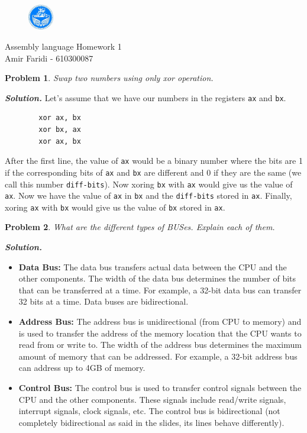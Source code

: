 \documentclass[12pt]{article}
\newtheorem{problem}{Problem}
\newenvironment{solution}[1][\it{Solution}]{\textbf{#1. } }{}
\begin{document}
\begin{figure}
    \centering
    \includegraphics[width=0.1\textwidth]{logo.png}
\end{figure}

\noindent  Assembly language \hfill Homework 1\\
Amir Faridi - 610300087

\hrulefill


\begin{problem}
Swap two numbers using only xor operation.
\end{problem}
\begin{solution}
    Let's assume that we have our numbers in the registers \texttt{ax} and \texttt{bx}.
    \begin{verbatim}
        xor ax, bx
        xor bx, ax
        xor ax, bx
    \end{verbatim}

    After the first line, the value of \texttt{ax} would be a binary number where the bits are 1 if the corresponding bits of \texttt{ax} and \texttt{bx} are different and 0 if they are the same (we call this number \texttt{diff-bits}).
    Now xoring \texttt{bx} with \texttt{ax} would give us the value of \texttt{ax}. Now we have the value of \texttt{ax} in \texttt{bx} and the \texttt{diff-bits} stored in \texttt{ax}.
    Finally, xoring \texttt{ax} with \texttt{bx} would give us the value of \texttt{bx} stored in \texttt{ax}.
\end{solution} 

\begin{problem}
    What are the different types of BUSes. Explain each of them.
\end{problem}
\begin{solution}
    \begin{itemize}
        \item \textbf{Data Bus:} The data bus transfers actual data between the CPU and the other components. The width of the data bus determines the number of bits that can be transferred at a time. For example, a 32-bit data bus can transfer 32 bits at a time. Data buses are bidirectional.
        \item \textbf{Address Bus:} The address bus is unidirectional (from CPU to memory) and is used to transfer the address of the memory location that the CPU wants to read from or write to. The width of the address bus determines the maximum amount of memory that can be addressed. For example, a 32-bit address bus can address up to 4GB of memory.
        \item \textbf{Control Bus:} The control bus is used to transfer control signals between the CPU and the other components. These signals include read/write signals, interrupt signals, clock signals, etc. The control bus is bidirectional (not completely bidirectional as said in the slides, its lines behave differently).
    \end{itemize}
\end{solution}
\end{document}
